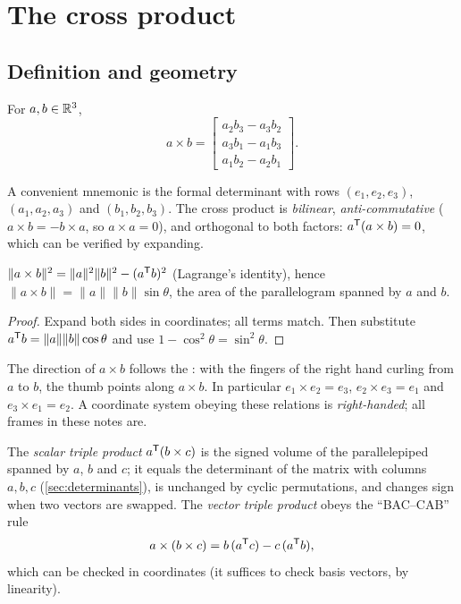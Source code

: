 \section{The cross product}
\label{sec:skew}

\subsection{Definition and geometry}

\begin{definition}
For $a, b \in \mathbb{R}^3$,
\begin{equation}
  a \times b = \begin{bmatrix} a_2b_3 - a_3b_2 \\ a_3b_1 - a_1b_3 \\ a_1b_2 - a_2b_1 \end{bmatrix}.
\end{equation}
\end{definition}

A convenient mnemonic is the formal determinant with rows $(e_1, e_2, e_3)$, $(a_1, a_2, a_3)$ and
$(b_1, b_2, b_3)$. The cross product is \emph{bilinear}, \emph{anti-commutative} ($a \times b = -b \times a$, so
$a \times a = 0$), and orthogonal to both factors: $a^{\mathsf{T}}(a \times b) = 0$, which can be verified by expanding.

\begin{proposition}
$\|a\times b\|^2 = \|a\|^2\|b\|^2 - (a^{\mathsf{T}} b)^2$ (Lagrange's identity), hence
$\|a \times b\| = \|a\|\|b\|\sin\theta$, the area of the parallelogram spanned by $a$ and $b$.
\end{proposition}
\begin{proof}
Expand both sides in coordinates; all terms match. Then substitute $a^{\mathsf{T}} b = \|a\|\|b\|\cos\theta$ and use
$1 - \cos^2\theta = \sin^2\theta$.
\end{proof}

The direction of $a \times b$ follows the : with the fingers of the right hand curling from
$a$ to $b$, the thumb points along $a \times b$. In particular $e_1 \times e_2 = e_3$, $e_2 \times e_3 = e_1$ and
$e_3 \times e_1 = e_2$. A coordinate system obeying these relations is \emph{right-handed}; all frames in these
notes are.

The \emph{scalar triple product} $a^{\mathsf{T}}(b \times c)$ is the signed volume of the parallelepiped spanned by $a$, $b$
and $c$; it equals the determinant of the matrix with columns $a, b, c$ (\cref{sec:determinants}), is unchanged by
cyclic permutations, and changes sign when two vectors are swapped. The \emph{vector triple product} obeys the
``BAC--CAB'' rule
\begin{equation}
  a \times (b \times c) = b\,(a^{\mathsf{T}} c) - c\,(a^{\mathsf{T}} b),
  \label{eq:bac-cab}
\end{equation}
which can be checked in coordinates (it suffices to check basis vectors, by linearity).

